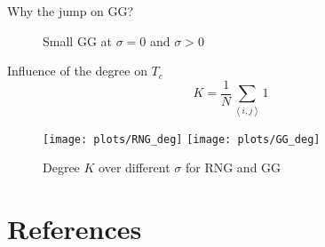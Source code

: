 \documentclass{beamer}
\newcommand{\avg}[1]{\left< #1 \right>}
\begin{document}
        \begin{frame}{Why the jump on GG?}
            \begin{figure}[htbp]
                \centering
                \subfigure{
                    \label{sfig:GGEdge:before}
                    \resizebox{0.43\textwidth}{!}{
                        
                    }
                }
                \subfigure{
                    \label{sfig:GGEdge:after}
                    \resizebox{0.43\textwidth}{!}{
                        
                    }
                }
                \caption
                {
                    Small GG at \(\sigma = 0\) and \(\sigma > 0\)
                }
                \label{fig:GGEdge}
            \end{figure}
        \end{frame}

        \begin{frame}{Influence of the degree on \(T_{c}\)}
            \begin{equation}
                K = \frac{1}{N} \sum_{\avg{i,j}} 1
                \label{eq:degree}
            \end{equation}
            \begin{figure}[htbp]
                \centering
                \subfigure
                {
                    \label{sfig:deg:RNG}
                    \texttt{[image: plots/RNG\_deg]}
                }
                \subfigure
                {
                    \label{sfig:deg:GG}
                    \texttt{[image: plots/GG\_deg]}
                }
                \caption
                {
                    Degree \(K\) over different \(\sigma\) for RNG and GG
                }
                \label{fig:Tc_deg}
            \end{figure}
        \end{frame}

\section{References}
    \begin{frame}[allowframebreaks]
        
        
    \end{frame}
\end{document}
